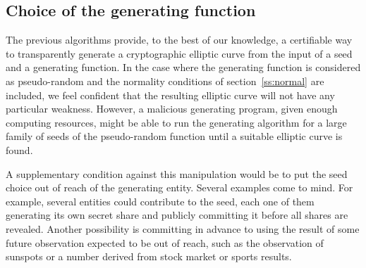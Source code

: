 \documentclass{article}
\begin{document}
\subsection{Choice of the generating function}

The previous algorithms provide, to the best of our knowledge,
a certifiable way to transparently generate a cryptographic elliptic curve
from the input of a seed and a generating function.
In the case where the generating function is considered as pseudo-random
and the normality conditions of section~\ref{ss:normal} are included,
we feel confident that the resulting elliptic curve
will not have any particular weakness.
However, a malicious generating program, given enough computing resources,
might be able to run the generating algorithm
for a large family of seeds of the pseudo-random function
until a suitable elliptic curve is found.

A supplementary condition against this manipulation
would be to put the seed choice out of reach of the generating entity.
Several examples come to mind.
For example, several entities could contribute to the seed,
each one of them generating its own secret share
and publicly committing it before all shares are revealed.
Another possibility is committing in advance to using
the result of some future observation expected to be out of reach,
such as the observation of sunspots
or a number derived from stock market or sports results.



\end{document}
